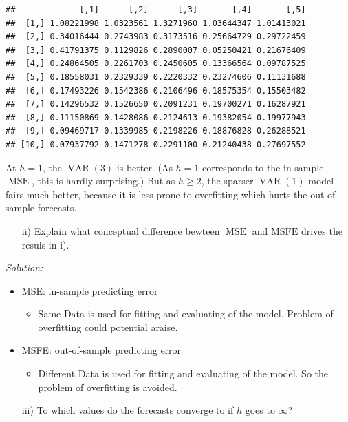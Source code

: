 \documentclass[12pt,a4paper]{article}
\newcommand{\MSE}{\operatorname{MSE}} %
\newcommand{\VAR}{\operatorname{VAR}} %
\begin{document}
\begin{verbatim}
##             [,1]      [,2]      [,3]       [,4]       [,5]
##  [1,] 1.08221998 1.0323561 1.3271960 1.03644347 1.01413021
##  [2,] 0.34016444 0.2743983 0.3173516 0.25664729 0.29722459
##  [3,] 0.41791375 0.1129826 0.2890007 0.05250421 0.21676409
##  [4,] 0.24864505 0.2261703 0.2450605 0.13366564 0.09787525
##  [5,] 0.18558031 0.2329339 0.2220332 0.23274606 0.11131688
##  [6,] 0.17493226 0.1542386 0.2106496 0.18575354 0.15503482
##  [7,] 0.14296532 0.1526650 0.2091231 0.19700271 0.16287921
##  [8,] 0.11150869 0.1428086 0.2124613 0.19382054 0.19977943
##  [9,] 0.09469717 0.1339985 0.2198226 0.18876828 0.26288521
## [10,] 0.07937792 0.1471278 0.2291100 0.21240438 0.27697552
\end{verbatim}

At \(h = 1\), the \(\VAR(3)\) is better. (As \(h = 1\) corresponds to
the in-sample \(\MSE\), this is hardly surprising.) But as \(h \geq 2\),
the sparser \(\VAR(1)\) model fairs much better, because it is less
prone to overfitting which hurts the out-of-sample forecasts.

\begin{itemize}
  \item[ii)] Explain what conceptual difference bewteen $\MSE$ and $\text{MSFE}$ drives the resuls in i). 
\end{itemize}

\emph{Solution:}

\begin{itemize}
  \item MSE: in-sample predicting error
  \begin{itemize}   
    \item Same Data is used for fitting and evaluating of the model. Problem of overfitting could potential araise. 
  \end{itemize}
  \item MSFE: out-of-sample predicting error
  \begin{itemize}   
    \item Different Data is used for fitting and evaluating of the model. So the problem of overfitting is avoided.
  \end{itemize}
\end{itemize}

\begin{itemize}
  \item[iii)] To which values do the forecasts converge to if $h$ goes to $\infty$?
\end{itemize}
\end{document}
